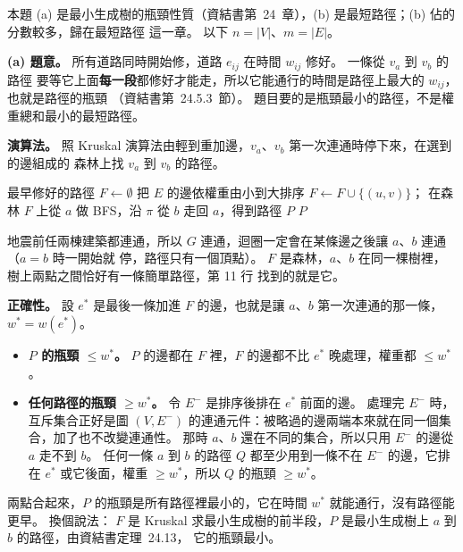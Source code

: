 \begin{pastsoln}
本題 (a) 是最小生成樹的瓶頸性質（資結書第~24~章），(b) 是最短路徑；(b) 佔的分數較多，歸在最短路徑
這一章。 以下 $n = |V|$、$m = |E|$。

\textbf{(a) 題意。} 所有道路同時開始修，道路 $e_{ij}$ 在時間 $w_{ij}$ 修好。 一條從 $v_a$ 到 $v_b$ 的路徑
要等它上面\textbf{每一段}都修好才能走，所以它能通行的時間是路徑上最大的 $w_{ij}$，也就是路徑的瓶頸
（資結書第~24.5.3~節）。 題目要的是瓶頸最小的路徑，不是權重總和最小的最短路徑。

\textbf{演算法。} 照 Kruskal 演算法由輕到重加邊，$v_a$、$v_b$ 第一次連通時停下來，在選到的邊組成的
森林上找 $v_a$ 到 $v_b$ 的路徑。
\begin{pseudo}{最早修好的路徑}
    \State $F \gets \emptyset$
        \State {}
    \EndFor
    \State 把 $E$ 的邊依權重由小到大排序
            \State \Break
        \EndIf
            \State $F \gets F \cup \{(u, v)\}$；
        \EndIf
    \EndFor
    \State 在森林 $F$ 上從 $a$ 做 BFS，沿 $\pi$ 從 $b$ 走回 $a$，得到路徑 $P$
    \State \Return $P$
\EndFunction
\end{pseudo}
地震前任兩棟建築都連通，所以 $G$ 連通，迴圈一定會在某條邊之後讓 $a$、$b$ 連通（$a = b$ 時一開始就
停，路徑只有一個頂點）。 $F$ 是森林，$a$、$b$ 在同一棵樹裡，樹上兩點之間恰好有一條簡單路徑，第 11 行
找到的就是它。

\textbf{正確性。} 設 $e^{*}$ 是最後一條加進 $F$ 的邊，也就是讓 $a$、$b$ 第一次連通的那一條，
$w^{*} = w(e^{*})$。
\begin{itemize}
\item \textbf{$P$ 的瓶頸 $\le w^{*}$。} $P$ 的邊都在 $F$ 裡，$F$ 的邊都不比 $e^{*}$ 晚處理，權重都
$\le w^{*}$。
\item \textbf{任何路徑的瓶頸 $\ge w^{*}$。} 令 $E^{-}$ 是排序後排在 $e^{*}$ 前面的邊。 處理完 $E^{-}$ 時，
互斥集合正好是圖 $(V, E^{-})$ 的連通元件：被略過的邊兩端本來就在同一個集合，加了也不改變連通性。
那時 $a$、$b$ 還在不同的集合，所以只用 $E^{-}$ 的邊從 $a$ 走不到 $b$。 任何一條 $a$ 到 $b$ 的路徑 $Q$
都至少用到一條不在 $E^{-}$ 的邊，它排在 $e^{*}$ 或它後面，權重 $\ge w^{*}$，所以 $Q$ 的瓶頸
$\ge w^{*}$。
\end{itemize}
兩點合起來，$P$ 的瓶頸是所有路徑裡最小的，它在時間 $w^{*}$ 就能通行，沒有路徑能更早。 換個說法：
$F$ 是 Kruskal 求最小生成樹的前半段，$P$ 是最小生成樹上 $a$ 到 $b$ 的路徑，由資結書定理~24.13，
它的瓶頸最小。


\end{pastsoln}
